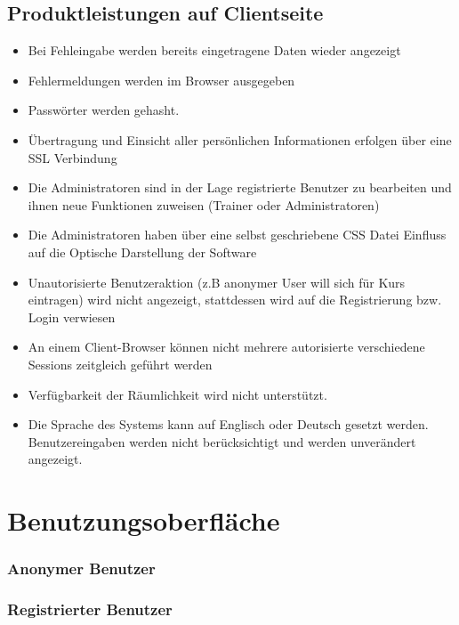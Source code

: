 \documentclass[a4paper]{scrreprt}
\begin{document}
	\section{Produktleistungen auf Clientseite}
			\begin{itemize}
				\item \Func{} Bei Fehleingabe werden bereits eingetragene Daten wieder angezeigt
				\item \Func{} Fehlermeldungen werden im Browser ausgegeben
				\item \Func{} Passwörter werden gehasht.
				\item \Func{} Übertragung und Einsicht aller persönlichen Informationen erfolgen über eine SSL Verbindung
				\item \Func{} Die Administratoren sind in der Lage registrierte Benutzer zu bearbeiten und ihnen neue Funktionen zuweisen (Trainer oder Administratoren)
				\item \Func{} Die Administratoren haben über eine selbst geschriebene CSS Datei Einfluss auf die Optische Darstellung der Software 
				\item \Func{} Unautorisierte Benutzeraktion (z.B anonymer User will sich für Kurs eintragen) wird nicht angezeigt, stattdessen wird auf die Registrierung bzw. Login verwiesen
				\item \Func{} An einem Client-Browser können nicht mehrere autorisierte verschiedene Sessions zeitgleich geführt werden
				\item \Func{} Verfügbarkeit der Räumlichkeit wird nicht unterstützt.
				\item \Func{} Die Sprache des Systems kann auf Englisch oder Deutsch gesetzt werden. Benutzereingaben werden nicht berücksichtigt und werden unverändert angezeigt.
			\end{itemize}
		
		
 
\chapter{Benutzungsoberfläche}
    
    
    \subsection{Anonymer Benutzer}
       	
       	
       	
    \subsection{Registrierter Benutzer}
       
\end{document}
